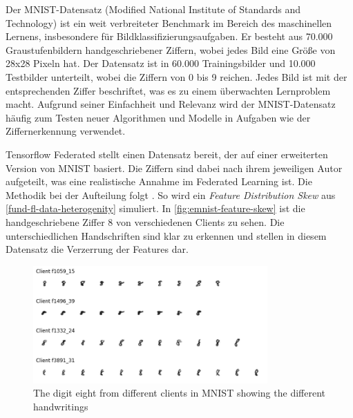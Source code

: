 Der MNIST-Datensatz (Modified National Institute of Standards and Technology) ist ein weit verbreiteter Benchmark im Bereich des maschinellen Lernens, insbesondere für Bildklassifizierungsaufgaben. Er besteht aus 70.000 Graustufenbildern handgeschriebener Ziffern, wobei jedes Bild eine Größe von 28x28 Pixeln hat. Der Datensatz ist in 60.000 Trainingsbilder und 10.000 Testbilder unterteilt, wobei die Ziffern von 0 bis 9 reichen. Jedes Bild ist mit der entsprechenden Ziffer beschriftet, was es zu einem überwachten Lernproblem macht. Aufgrund seiner Einfachheit und Relevanz wird der MNIST-Datensatz häufig zum Testen neuer Algorithmen und Modelle in Aufgaben wie der Ziffernerkennung verwendet.

Tensorflow Federated stellt einen Datensatz bereit, der auf einer erweiterten Version von MNIST basiert. Die Ziffern sind dabei nach ihrem jeweiligen Autor aufgeteilt, was eine realistische Annahme im Federated Learning ist. Die Methodik bei der Aufteilung folgt \textcite{caldas:2018}. So wird ein \textit{Feature Distribution Skew} aus \autoref{fund-fl-data-heterogenity} simuliert. In \autoref{fig:emnist-feature-skew} ist die handgeschriebene Ziffer 8 von verschiedenen Clients zu sehen. Die unterschiedlichen Handschriften sind klar zu erkennen und stellen in diesem Datensatz die Verzerrung der Features dar.

\begin{figure}[tb]
	\centering
	\includegraphics[width=0.8\textwidth]{Bilder/emnist_feature_distribution_skew.png}
	\caption{The digit eight from different clients in MNIST showing the different handwritings}
	\label{fig:emnist-feature-skew}
\end{figure}


